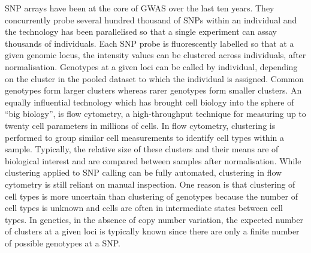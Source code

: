 \gls{SNP} arrays have been at the core of \gls{GWAS} over the last ten years.
They concurrently probe several hundred thousand of \glspl{SNP} within an individual and the technology
has been parallelised so that a single experiment can assay thousands of individuals.
Each SNP probe is fluorescently labelled so that at a given genomic locus, the intensity values can be clustered across individuals, 
after normalisation.
Genotypes at a given loci can be called by individual, depending on the cluster in the pooled dataset to which the individual is assigned.
Common genotypes form larger clusters whereas rarer genotypes form smaller clusters.
An equally influential technology which has brought cell biology into the sphere of ``big biology'', is flow cytometry,
a high-throughput technique for measuring up to twenty cell parameters in millions of cells.
In flow cytometry, clustering is performed to group similar cell measurements to identify cell types within a sample.
Typically, the relative size of these clusters and their means are of biological interest and are compared between samples after normalisation.
While clustering applied to \gls{SNP} calling can be fully automated,
clustering in flow cytometry is still reliant on manual inspection.
One reason is that
clustering of cell types is more uncertain than clustering of genotypes because the number of cell types is unknown and
cells are often in intermediate states between cell types.
In genetics, in the absence of copy number variation,
the expected number of clusters at a given loci is typically known
since there are only a finite number of possible genotypes at a \gls{SNP}.


